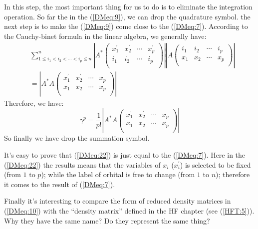 In this step, the most important thing for us to do is to eliminate
the integration operation. So far the in the (\ref{DMeq:9}), we can
drop the quadrature symbol. the next step is to make the
(\ref{DMeq:9}) come close to the (\ref{DMeq:7}). According to the
Cauchy-binet formula in the linear algebra, we generally have:
\begin{align}\label{}
&\sum^{n}_{1 \leq i_{1}<i_{2}<\cdots<i_{p}
    \leq n}\left|A^{*}\begin{pmatrix}
                        x^{'}_{1} & x^{'}_{2} & \cdots & x^{'}_{p} \\
                        i_{1} & i_{2} & \cdots & i_{p} \\
                      \end{pmatrix}
\right| \left|A\begin{pmatrix}
                        i_{1} & i_{2} & \cdots & i_{p} \\
                        x_{1} & x_{2} & \cdots & x_{p} \\
                      \end{pmatrix}
\right| \nonumber \\
&=    \left|A^{*}A\begin{pmatrix}
                        x^{'}_{1} & x^{'}_{2} & \cdots & x_{p} \\
                        x_{1} & x_{2} & \cdots & x_{p} \\
                      \end{pmatrix}
\right|
\end{align}
Therefore, we have:
\begin{equation}\label{DMeq:22}
  \gamma^{p} = \frac{1}{p!}\left|A^{*}A\begin{pmatrix}
                        x^{'}_{1} & x^{'}_{2} & \cdots & x_{p} \\
                        x_{1} & x_{2} & \cdots & x_{p} \\
                      \end{pmatrix}
\right|
\end{equation}
So finally we have drop the summation symbol.

It's easy to prove that (\ref{DMeq:22}) is just equal to the
(\ref{DMeq:7}). Here in the (\ref{DMeq:22}) the results means that
the variables of $x_{i}$ ($x^{'}_{i}$) is selected to be fixed (from
$1$ to $p$); while the label of orbital is free to change (from $1$
to $n$); therefore it comes to the result of (\ref{DMeq:7}).

Finally it's interesting to compare the form of reduced density
matrices in (\ref{DMeq:10}) with the ``density matrix'' defined in the
HF chapter (see (\ref{HFT:5})). Why they have the same name? Do they
represent the same thing?

